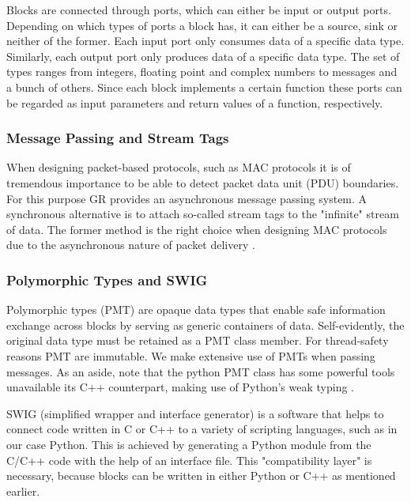 Blocks are connected through ports, which can either be input or output ports. Depending on which types of ports a block has, it can either be a source, sink or neither of the former. 
Each input port only consumes data of a specific data type. Similarly, each output port only produces data of a specific data type. The set of types ranges from integers, floating point and complex numbers to messages and a bunch of others. Since each block implements a certain function these ports can be regarded as input parameters and return values of a function, respectively.

\subsubsection{Message Passing and Stream Tags}

When designing packet-based protocols, such as MAC protocols it is of tremendous importance to be able to detect packet data unit (PDU) boundaries. For this purpose GR provides an asynchronous message passing system. A synchronous alternative is to attach so-called stream tags to the "infinite" stream of data. The former method is the right choice when designing MAC protocols due to the asynchronous nature of packet delivery \cite{GR1}\cite{GRDocs}.  

\subsubsection{Polymorphic Types and SWIG} 

Polymorphic types (PMT) are opaque data types that enable safe information exchange across blocks by serving as generic containers of data. Self-evidently, the original data type must be retained as a PMT class member. For thread-safety reasons PMT are immutable. We make extensive use of PMTs when passing messages. As an aside, note that the python PMT class has some powerful tools unavailable its C++ counterpart, making use of Python's weak typing \cite{GRDocs}.

SWIG (simplified wrapper and interface generator) is a software that helps to connect code written in C or C++ to a variety of scripting languages, such as in our case Python. This is achieved by generating a Python module from the C/C++ code with the help of an interface file. This "compatibility layer" is necessary, because blocks can be written in either Python or C++ as mentioned earlier.